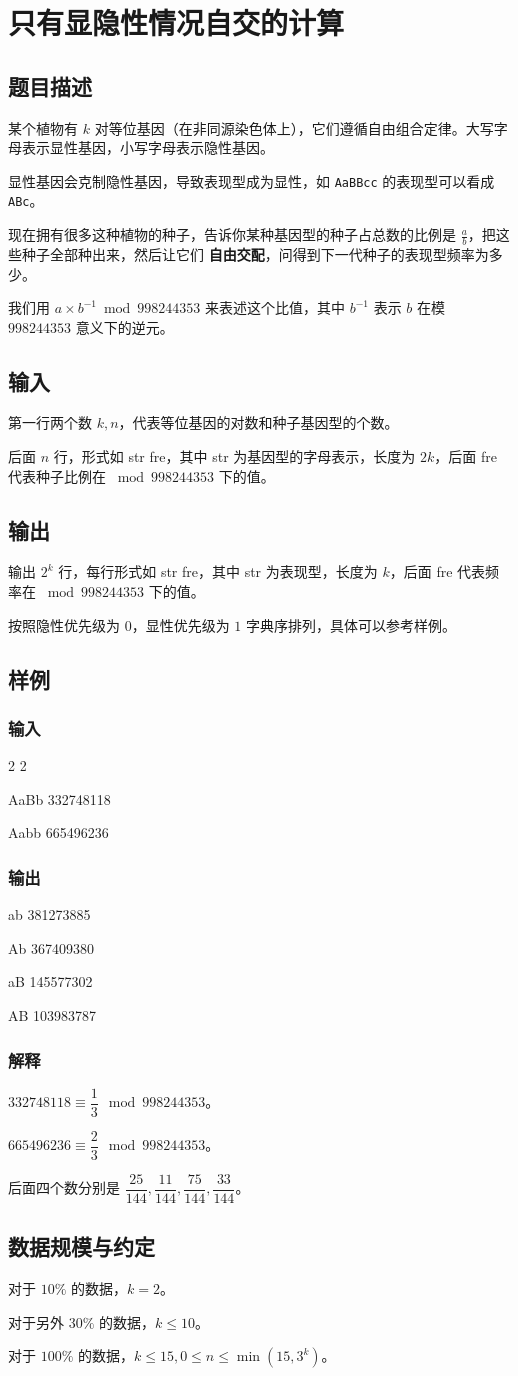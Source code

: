 \documentclass{article}
\newcommand \Problem [1] {\newpage \section{#1}}
\newcommand \Description {\subsection*{题目描述}}
\newcommand \Input {\subsection*{输入}}
\newcommand \Output {\subsection*{输出}}
\newcommand \Sample [1][] {\subsection*{样例 #1}}
\newcommand \SampleInput {\subsubsection*{输入}}
\newcommand \SampleOutput {\subsubsection*{输出}}
\newcommand \Explanation {\subsubsection*{解释}}
\newcommand \Constraint {\subsection*{数据规模与约定}}
\begin{document}
	\Problem{只有显隐性情况自交的计算}
	\Description

	某个植物有 $k$ 对等位基因（在非同源染色体上），它们遵循自由组合定律。大写字母表示显性基因，小写字母表示隐性基因。

	显性基因会克制隐性基因，导致表现型成为显性，如 \texttt{AaBBcc} 的表现型可以看成 \texttt{ABc}。

	现在拥有很多这种植物的种子，告诉你某种基因型的种子占总数的比例是 $\frac{a}{b}$，把这些种子全部种出来，然后让它们 \textbf{自由交配}，问得到下一代种子的表现型频率为多少。

	我们用 $a \times b^{-1} \bmod 998244353$ 来表述这个比值，其中 $b^{-1}$ 表示 $b$ 在模 $998244353$ 意义下的逆元。

	\Input

	第一行两个数 $k,n$，代表等位基因的对数和种子基因型的个数。

	后面 $n$ 行，形式如 str fre，其中 str 为基因型的字母表示，长度为 $2k$，后面 fre 代表种子比例在 $\bmod 998244353$ 下的值。

	\Output

	输出 $2^k$ 行，每行形式如 str fre，其中 str 为表现型，长度为 $k$，后面 fre 代表频率在 $\bmod 998244353$ 下的值。

	按照隐性优先级为 $0$，显性优先级为 $1$ 字典序排列，具体可以参考样例。

	\Sample
	\SampleInput
2 2

AaBb 332748118

Aabb 665496236

	\SampleOutput
ab 381273885

Ab 367409380

aB 145577302

AB 103983787

	\Explanation

	$332748118\equiv \dfrac{1}{3} \mod {998244353}$。

	$665496236\equiv \dfrac{2}{3} \mod {998244353}$。

	后面四个数分别是 $\dfrac{25}{144},\dfrac{11}{144},\dfrac{75}{144},\dfrac{33}{144}$。

	\Constraint
	
	对于 $10\%$ 的数据，$k=2$。

	对于另外 $30\%$ 的数据，$k \le 10$。

	对于 $100\%$ 的数据，$k \le 15, 0 \le n \le \min(15,3^k)$。
\end{document}
